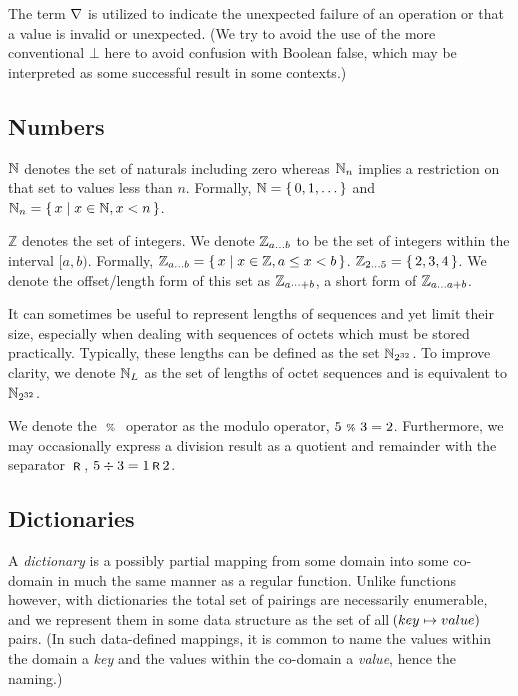 The term $\nabla$ is utilized to indicate the unexpected failure of an operation or that a value is invalid or unexpected. (We try to avoid the use of the more conventional $\bot$ here to avoid confusion with Boolean false, which may be interpreted as some successful result in some contexts.)

\subsection{Numbers}\label{sec:numbers}

$\mathbb{N}$ denotes the set of naturals including zero whereas $\mathbb{N}_{n}$ implies a restriction on that set to values less than $n$. Formally, $\N = \set{0, 1, \dots}$ and $\Nmax{n} = \set{\build{x}{x \in \N, x < n}}$.

$\mathbb{Z}$ denotes the set of integers. We denote $\mathbb{Z}_{a \dots b}$ to be the set of integers within the interval $[a, b)$. Formally, $\mathbb{Z}\interval{a}{b} = \set{\build{x}{x \in \mathbb{Z}, a \le x < b}}$. \Eg $\mathbb{Z}\interval{2}{5} = \set{2, 3, 4}$. We denote the offset/length form of this set as $\mathbb{Z}_{a \dots+ b}$, a short form of $\mathbb{Z}_{a \dots a+b}$.

It can sometimes be useful to represent lengths of sequences and yet limit their size, especially when dealing with sequences of octets which must be stored practically. Typically, these lengths can be defined as the set $\mathbb{N}_{2^{32}}$. To improve clarity, we denote $\mathbb{N}_L$ as the set of lengths of octet sequences and is equivalent to $\mathbb{N}_{2^{32}}$.

We denote the $\ \text{\scriptsize{\%}}\ $ operator as the modulo operator, \eg $5 \ \text{\scriptsize{\%}}\  3 = 2$. Furthermore, we may occasionally express a division result as a quotient and remainder with the separator $\text{\hspace{2pt}\footnotesize{\textsf{R}}\hspace{2pt}}$, \eg $5 \div 3 = 1 \text{\hspace{2pt}\footnotesize{\textsf{R}}\hspace{2pt}} 2$.

\subsection{Dictionaries}\label{sec:dictionaries}

A \emph{dictionary} is a possibly partial mapping from some domain into some co-domain in much the same manner as a regular function. Unlike functions however, with dictionaries the total set of pairings are necessarily enumerable, and we represent them in some data structure as the set of all $\kv{key}{value}$ pairs. (In such data-defined mappings, it is common to name the values within the domain a \emph{key} and the values within the co-domain a \emph{value}, hence the naming.)

